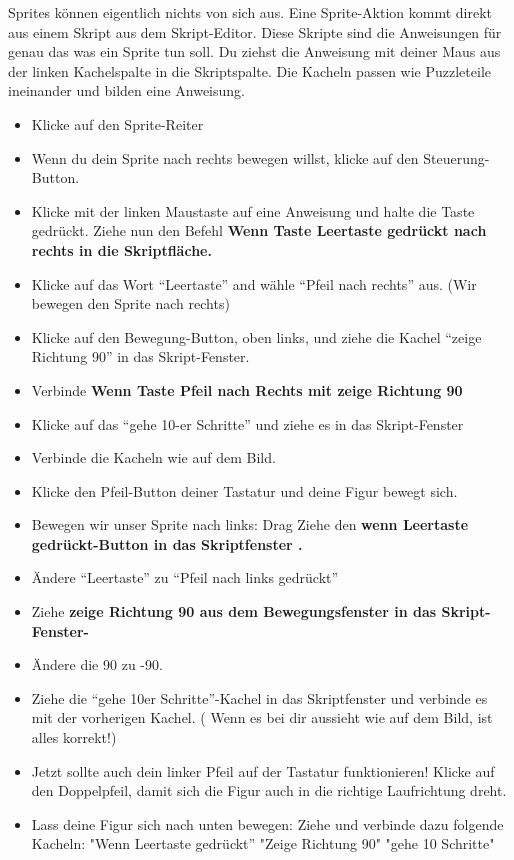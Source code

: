 Sprites können eigentlich nichts von sich aus. Eine Sprite-Aktion kommt direkt aus einem Skript aus dem Skript-Editor. Diese Skripte sind die Anweisungen für genau das was ein Sprite tun soll.
Du ziehst die Anweisung mit deiner Maus aus der linken Kachelspalte in die Skriptspalte. Die Kacheln passen wie Puzzleteile ineinander und bilden eine Anweisung.


\begin{itemize}
\item Klicke auf den Sprite-Reiter
\item Wenn du dein Sprite nach rechts bewegen willst, klicke auf den Steuerung-Button.
\item Klicke mit der linken Maustaste auf eine Anweisung und halte die Taste gedrückt. Ziehe nun den Befehl \bf{Wenn Taste Leertaste gedrückt} nach rechts in die Skriptfläche. 
\item Klicke auf das Wort “Leertaste” and wähle “Pfeil nach rechts” aus.  (Wir bewegen den Sprite nach rechts)
\item Klicke auf den Bewegung-Button, oben links, und ziehe die Kachel “zeige Richtung 90” in das Skript-Fenster.
\item Verbinde \bf{Wenn Taste Pfeil nach Rechts} mit \bf{zeige Richtung 90}
\item Klicke auf das “gehe 10-er Schritte” und ziehe es in das Skript-Fenster 
\item Verbinde die Kacheln wie auf dem Bild. 
\item Klicke den Pfeil-Button deiner Tastatur und deine Figur bewegt sich.
\item Bewegen wir unser Sprite nach links: Drag Ziehe den \bf{wenn Leertaste gedrückt}-Button in das Skriptfenster .
\item Ändere “Leertaste” zu “Pfeil nach links gedrückt”
\item Ziehe \bf{zeige Richtung 90} aus dem Bewegungsfenster in das Skript-Fenster-
\item Ändere die 90 zu -90.
\item Ziehe die “gehe 10er Schritte”-Kachel in das Skriptfenster und verbinde es mit der vorherigen Kachel.
( Wenn es bei dir aussieht wie auf dem Bild, ist alles korrekt!)
\item Jetzt sollte auch dein linker Pfeil auf der Tastatur funktionieren! Klicke auf den Doppelpfeil, damit sich die Figur auch in die richtige Laufrichtung dreht. 
\item Lass deine Figur sich nach unten bewegen: Ziehe und verbinde dazu folgende Kacheln:
\subitem "Wenn Leertaste gedrückt”
\subitem "Zeige Richtung 90"
\subitem "gehe 10 Schritte"
\end{itemize}

